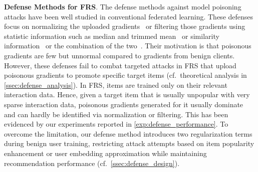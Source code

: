 \smallskip
\noindent\textbf{Defense Methods for FRS}. 
The defense methods against model poisoning attacks have been well studied in conventional federated learning.
These defenses focus on normalizing the uploaded gradients~\cite{NormBound} or 
filtering those gradients using statistic information such as median and trimmed mean~\cite{Media-TrimmedMean} or similarity information~\cite{Krum-MultiKrum} or the combination of the two~\cite{Bulyan}.
Their motivation is that poisonous gradients are few but unnormal compared to gradients from benign clients.
However, these defenses fail to combat targeted attacks in FRS that upload poisonous gradients to promote specific target items (cf.\ theoretical analysis in \cref{ssec:defense_analysis}).
In FRS, items are trained only on their relevant interaction data. Hence, given a target item that is usually unpopular with very sparse interaction data, poisonous gradients generated for it usually dominate and can hardly be identified via normalization or filtering.
This has been evidenced by our experiments reported in \cref{exp:defense_performance}.
To overcome the limitation, our defense method introduces two regularization terms during benign user training, restricting attack attempts based on item popularity enhancement or user embedding approximation while maintaining recommendation performance (cf.\ \cref{ssec:defense_design}).


